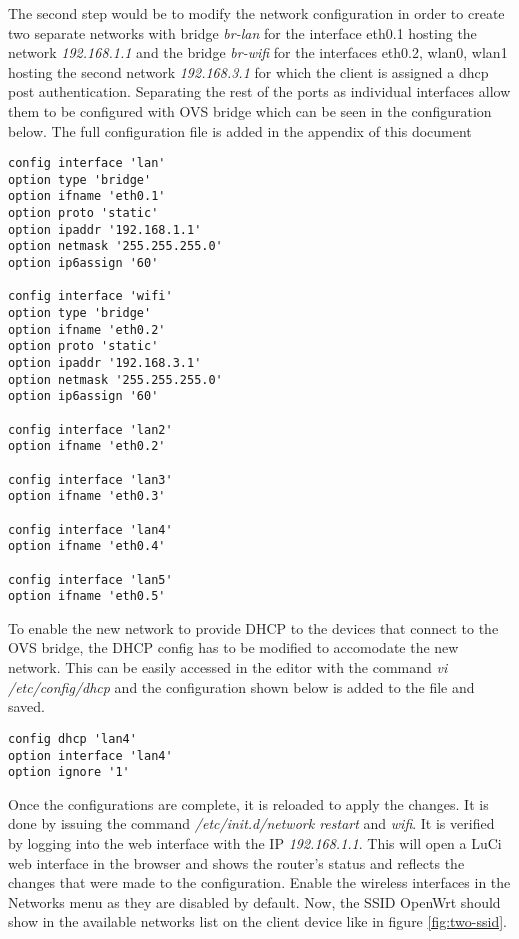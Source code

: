 The second step would be to modify the network configuration in order to create two separate networks with bridge \textit{br-lan} for the interface eth0.1 hosting the network \textit{192.168.1.1} and the bridge \textit{br-wifi} for the interfaces eth0.2, wlan0, wlan1 hosting the second network \textit{192.168.3.1} for which the client is assigned a dhcp post authentication. Separating the rest of the ports as individual interfaces allow them to be configured with OVS bridge which can be seen in the configuration below. The full configuration file is added in the appendix of this document 

\begin{lstlisting}
config interface 'lan'
option type 'bridge'
option ifname 'eth0.1'
option proto 'static'
option ipaddr '192.168.1.1'
option netmask '255.255.255.0'
option ip6assign '60'

config interface 'wifi'
option type 'bridge'
option ifname 'eth0.2'
option proto 'static'
option ipaddr '192.168.3.1'
option netmask '255.255.255.0'
option ip6assign '60'

config interface 'lan2'
option ifname 'eth0.2'

config interface 'lan3'
option ifname 'eth0.3'

config interface 'lan4'
option ifname 'eth0.4'

config interface 'lan5'
option ifname 'eth0.5'

\end{lstlisting}

To enable the new network to provide DHCP to the devices that connect to the OVS bridge, the DHCP config has to be modified to accomodate the new network. This can be easily accessed in the editor with the command \textit{vi /etc/config/dhcp} and the configuration shown below is added to the file and saved.

\begin{lstlisting}
config dhcp 'lan4'
option interface 'lan4'
option ignore '1'
\end{lstlisting}

Once the configurations are complete, it is reloaded to apply the changes. It is done by issuing the command \textit{/etc/init.d/network restart} and \textit{wifi}. It is verified by logging into the web interface with the IP \textit{192.168.1.1}. This will open a LuCi web interface in the browser and shows the router's status and reflects the changes that were made to the configuration. Enable the wireless interfaces in the Networks menu as they are disabled by default. Now, the SSID OpenWrt should show in the available networks list on the client device like in figure \ref{fig:two-ssid}.

